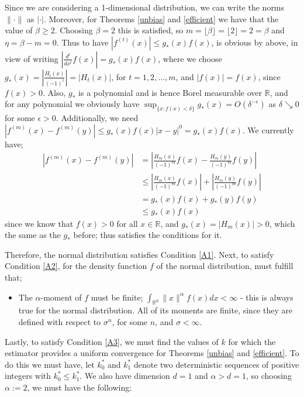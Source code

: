 \documentclass[12pt]{report}
\begin{document}
\begin{itemize}
Since we are considering a 1-dimensional distribution, we can write the norms $\| \cdotp \|$ as  $| \cdotp |$. Moreover, for Theorems \ref{unbias} and \ref{efficient} we have that the value of $\beta \geq 2$. Choosing $\beta = 2$ this is satisfied, so $m = \lfloor \beta \rfloor =  \lfloor 2 \rfloor = 2 = \beta$ and $\eta = \beta -m =0$. Thus to have $|f^{(t)}(x)| \leq g_{*}(x) f(x)$, is obvious by above, in view of writing $|\frac{d^t}{dx^t} f(x)| = g_{*}(x) f(x)$, where we choose $ g_{*}(x) = |\frac{H_{t}(x)}{(-1)^t}| = |H_{t}(x)|$, for $t=1,2,...,m$, and $|f(x)| = f(x)$, since $f(x) >0$. Also, $g_{*}$ is a polynomial and is hence Borel measurable over $\mathbb{R}$, and for any polynomial we obviously have $\sup_{\{x : f(x) < \delta\}} g_{*}(x) = O(\delta^{-\epsilon})$ as $\delta \searrow 0$ for some $\epsilon >0$. Additionally, we need $|f^{(m)}(x) - f^{(m)}(y)| \leq g_{*}(x) f(x)| x-y|^{0} = g_{*}(x) f(x)$. We currently have;
\begin{align*}
|f^{(m)}(x) - f^{(m)}(y)| &= \left| \frac{H_{m}(x)}{(-1)^m} f(x) - \frac{H_{m}(y)}{(-1)^m} f(y) \right| \\
&\leq \left| \frac{H_{m}(x)}{(-1)^m} f(x) \right| + \left| \frac{H_{m}(y)}{(-1)^m} f(y) \right| \\
&= g_{*}(x)f(x) + g_{*}(y)f(y) \\
&\leq g_{*}(x)f(x)
\end{align*}
since we know that $f(x) >0$ for all $x \in \mathbb{R}$, and $g_{*}(x) = |H_{m}(x)| >0$, which the same as the $g_{*}$ before; thus satisfies the conditions for it.
\end{itemize}

Therefore, the normal distribution satisfies Condition \ref{A1}. Next, to satisfy Condition \ref{A2}, for the density function $f$ of the normal distribution, must fulfill that;
\begin{itemize}
\item The $\alpha$-moment of $f$ must be finite; $\int_{\mathbb{R}^{d}} \| x \|^{\alpha} f(x) dx < \infty$ - this is always true for the normal distribution. All of its moments are finite, since they are defined with respect to $\sigma^n$, for some $n$, and $\sigma < \infty$.

\end{itemize}

Lastly, to satisfy Condition \ref{A3}, we must find the values of $k$ for which the estimator provides a uniform convergence for Theorems \ref{unbias} and \ref{efficient}. To do this we must have, let $k_{0}^{*}$ and $k_{1}^{*}$ denote two deterministic sequences of positive integers with $k_{0}^{*} \leq k_{1}^{*}$. We also have dimension $d=1$ and $\alpha > d =1$, so choosing $\alpha := 2$, we must have the following:
\end{document}
